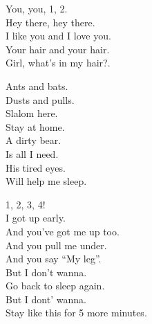 
\label{ep:teenage-gizzard}




You, you, 1, 2. \\

Hey there, hey there. \\
I like you and I love you. \\
Your hair and your hair. \\

Girl, what's in my hair?. \\




Ants and bats. \\
Dusts and pulls. \\
Slalom here. \\
Stay at home. \\

A dirty bear. \\
Is all I need. \\
His tired eyes. \\
Will help me sleep. \\




1, 2, 3, 4! \\

I got up early. \\
And you've got me up too. \\
And you pull me under. \\
And you say ``My leg''. \\
But I don't wanna. \\
Go back to sleep again. \\
But I dont' wanna. \\
Stay like this for 5 more minutes. \\

